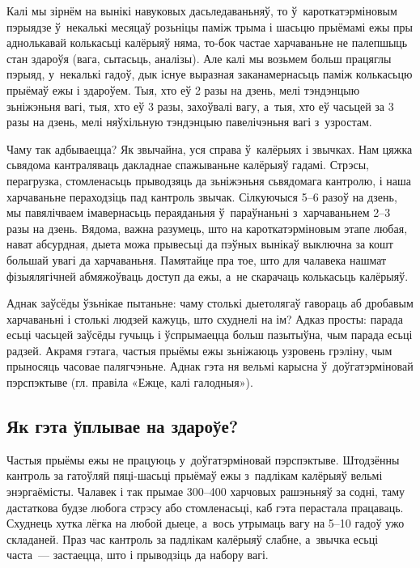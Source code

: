 Калі мы зірнём на вынікі навуковых дасьледаваньняў, то ў~кароткатэрміновым пэрыядзе ў~некалькі месяцаў розьніцы паміж трыма і шасьцю прыёмамі ежы пры аднолькавай колькасьці калёрыяў няма, то-бок частае харчаваньне не палепшыць стан здароўя (вага, сытасьць, аналізы). Але калі мы возьмем больш працяглы пэрыяд, у~некалькі гадоў, дык існуе выразная заканамернасьць паміж колькасьцю прыёмаў ежы і здароўем. Тыя, хто еў 2 разы на дзень, мелі тэндэнцыю зьніжэньня вагі, тыя, хто еў 3 разы, захоўвалі вагу, а~тыя, хто еў часьцей за 3 разы на дзень, мелі няўхільную тэндэнцыю павелічэньня вагі з~узростам.

Чаму так адбываецца? Як звычайна, уся справа ў~калёрыях і звычках. Нам цяжка сьвядома кантраляваць дакладнае спажываньне калёрыяў гадамі. Стрэсы, перагрузка, стомленасьць прыводзяць да зьніжэньня сьвядомага кантролю, і наша харчаваньне пераходзіць пад кантроль звычак. Сілкуючыся 5--6 разоў на дзень, мы павялічваем імавернасьць пераяданьня ў~параўнаньні з~харчаваньнем 2--3 разы на дзень. Вядома, важна разумець, што на кароткатэрміновым этапе любая, нават абсурдная, дыета можа прывесьці да пэўных вынікаў выключна за кошт большай увагі да харчаваньня. Памятайце пра тое, што для чалавека нашмат фізыялягічней абмяжоўваць доступ да ежы, а~не скарачаць колькасьць калёрыяў.

Аднак заўсёды ўзьнікае пытаньне: чаму столькі дыетолягаў гавораць аб дробавым харчаваньні і столькі людзей кажуць, што схуднелі на ім? Адказ просты: парада есьці часьцей заўсёды гучыць і ўспрымаецца больш пазытыўна, чым парада есьці радзей. Акрамя гэтага, частыя прыёмы ежы зьніжаюць узровень грэліну, чым прыносяць часовае палягчэньне. Аднак гэта ня вельмі карысна ў~доўгатэрміновай пэрспэктыве (гл. правіла «Ежце, калі галодныя»).

\subsection{Як гэта ўплывае на здароўе?}

Частыя прыёмы ежы не працуюць у~доўгатэрміновай пэрспэктыве. Штодзённы кантроль за гатоўляй пяці-шасьці прыёмаў ежы з~падлікам калёрыяў вельмі энэргаёмісты. Чалавек і так прымае 300--400 харчовых рашэньняў за содні, таму дастаткова будзе любога стрэсу або стомленасьці, каб гэта перастала працаваць. Схуднець хутка лёгка на любой дыеце, а~вось утрымаць вагу на 5--10 гадоў ужо складаней. Праз час кантроль за падлікам калёрыяў слабне, а~звычка есьці часта~--- застаецца, што і прыводзіць да набору вагі.

